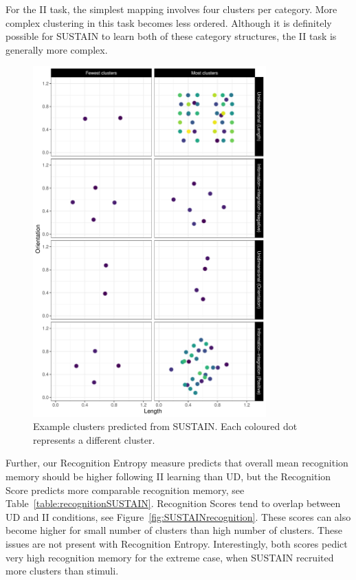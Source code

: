\documentclass[12pt]{article}
\begin{document}
For the II task, the simplest mapping involves four clusters per category.
More complex clustering in this task becomes less ordered. Although it is 
definitely possible for SUSTAIN to learn both of these category structures,
the II task is generally more complex.

\begin{figure}
	\centering
	\includegraphics[width=0.8\textwidth]{Images/pu037clustersSUSTAIN}	
	\caption{Example clusters predicted from SUSTAIN. Each coloured dot represents a different cluster.}
	\label{fig:SUSTAINclusters}
\end{figure}

Further, our Recognition Entropy measure predicts that overall mean recognition memory
should be higher following II learning than UD, but the Recognition Score
predicts more comparable recognition memory, see Table~\ref{table:recognitionSUSTAIN}.
Recognition Scores tend to overlap between UD and II conditions, see 
Figure~\ref{fig:SUSTAINrecognition}. These scores can also become higher
for small number of clusters than high number of clusters. These issues
are not present with Recognition Entropy. Interestingly, both scores pedict
very high recognition memory for the extreme case, when SUSTAIN recruited
more clusters than stimuli.
\end{document}

